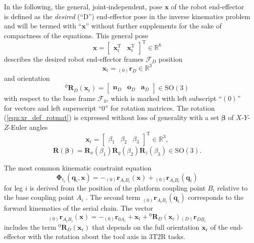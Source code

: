 \documentclass[robotics,article,submit,moreauthors,pdftex]{Definitions/mdpi}
\newcommand{\bm}[1]{\boldsymbol{#1}}
\newcommand{\ortvek}[4]{{ }_{(#1)}{\boldsymbol{#2}}^{#3}_{#4} }
\newcommand{\vek}[3]{\boldsymbol{#1}^{#2}_{#3}}
\newcommand{\rotmat}[2]{{{ }^{#1}\boldsymbol{R}}_{#2}}
\newcommand{\transp}[0]{{\mathrm{T}}}
\newcommand{\ks}[1]{{\mathcal{F}}_{#1}}
\begin{document}
In the following, the general, joint-independent, pose $\bm{x}$ of the robot end-effector is defined as the \emph{desired} (``D'') end-effector pose in the inverse kinematics problem and will be termed with ``$\bm{x}$'' without further supplements for the sake of compactness of the equations.
This general pose
%
\begin{equation}
\bm{x}
=
\begin{bmatrix}
\bm{x}_{\mathrm{t}}^\transp & \bm{x}_{\mathrm{r}}^\transp
\end{bmatrix}^\transp
\in {\mathbb{R}}^{6}
\label{equ:x_def}
\end{equation}
%
describes the desired robot end-effector frames $\ks{D}$ position 
%
\begin{equation}
\bm{x}_{\mathrm{t}}
=
\ortvek{0}{r}{}{D}
\in {\mathbb{R}}^{3}
\label{equ:xt_def}
\end{equation}  
%
and orientation 
%
\begin{equation}
\rotmat{0}{D} (\bm{x}_{\mathrm{r}})
=
\begin{bmatrix}\vek{n}{}{D} & \vek{o}{}{D} & \vek{a}{}{D}\end{bmatrix} \in \mathrm{SO(3)}
\label{equ:xr_def_rotmat}
\end{equation}
%
with respect to the base frame $\ks{0}$, which is marked with left subscript ``$(0)$'' for vectors and left superscript ``$0$'' for rotation matrices.
The rotation (\ref{equ:xr_def_rotmat}) is expressed without loss of generality with a set $\bm{\beta}$ of $X$-$Y$-$Z$-Euler angles
%
\begin{equation}
\bm{x}_{\mathrm{r}}
=
\begin{bmatrix}
\beta_1  & \beta_2 & \beta_3
\end{bmatrix}^{\mathrm{T}}
\in {\mathbb{R}}^{3},
\label{equ:xr_def}
\end{equation} 
%
\begin{equation}
\bm{R}(\bm{\beta}) = \bm{R}_x(\beta_1) \bm{R}_y(\beta_2) \bm{R}_z(\beta_3) \in \mathrm{SO(3)}.
\label{equ:def_rmat_xyz}
\end{equation}
%




The most common kinematic constraint equation 
%
\begin{equation}
\bm{\Phi}_{\mathrm{t}_i}(\bm{q}_i,\bm{x}) = - \ortvek{0}{r}{}{A_iB_i}(\bm{x}) + \ortvek{0}{r}{}{A_iB_i}(\bm{q}_i) 
\end{equation}
%
for leg $i$ is derived from the position of the platform coupling point $B_i$ relative to the base coupling point $A_i$ \cite{Merlet2006}.
The second term $\ortvek{0}{r}{}{A_iB_i}(\bm{q}_i)$ corresponds to the forward kinematics of the serial chain. 
The vector
\begin{equation}
\ortvek{0}{r}{}{A_iB_i}(\bm{x}) = 
- \ortvek{0}{r}{}{0A_i}
+ \bm{x}_{\mathrm{t}} + \rotmat{0}{D}(\bm{x}_{\mathrm{r}}) \ortvek{D}{r}{}{DB_i}
\end{equation}
%
includes the term $\rotmat{0}{D}(\bm{x}_{\mathrm{r}})$ that depends on the full  orientation $\bm{x}_{\mathrm{r}}$ of the end-effector with the rotation about the tool axis in 3T2R tasks.
\end{document}
